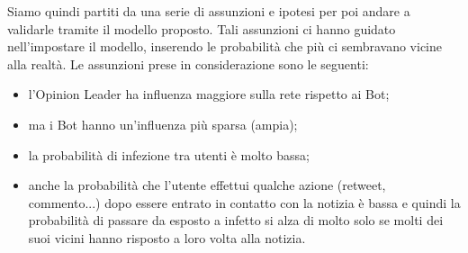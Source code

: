 Siamo quindi partiti da una serie di assunzioni e ipotesi per poi andare a validarle tramite il modello proposto. Tali assunzioni ci hanno guidato nell’impostare il modello, inserendo le probabilità che più ci sembravano vicine alla realtà. Le assunzioni prese in considerazione sono le seguenti:
\begin{itemize}
\item l'Opinion Leader ha influenza maggiore sulla rete rispetto ai Bot;
\item ma i Bot hanno un'influenza più sparsa (ampia);
\item la probabilità di infezione tra utenti è molto bassa;
\item anche la probabilità che l’utente effettui qualche azione (retweet, commento...) dopo essere entrato in contatto con la notizia è bassa e quindi la probabilità di passare da esposto a infetto si alza di molto solo se molti dei suoi vicini hanno risposto a loro volta alla notizia.
\end{itemize}
